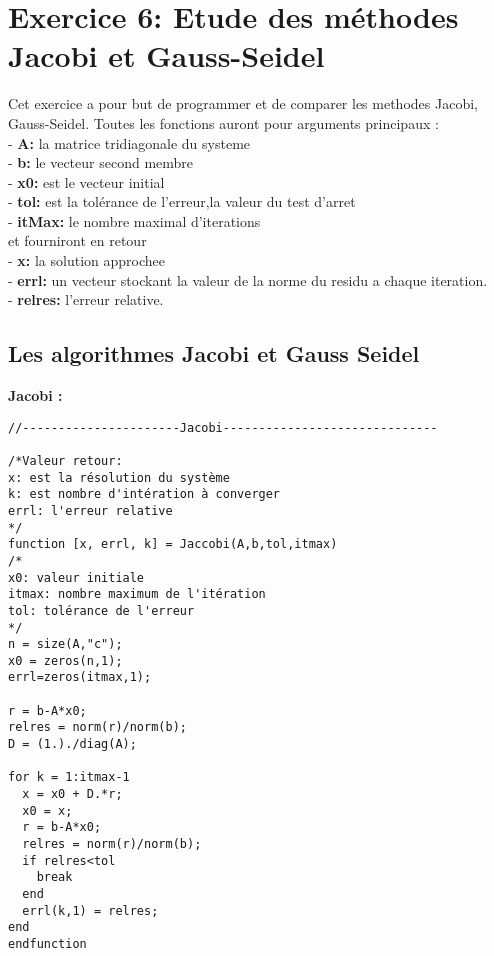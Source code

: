 \documentclass[12pt]{report}
\begin{document}
\section{Exercice 6: Etude des méthodes Jacobi et Gauss-Seidel}

Cet exercice a pour but de programmer et de comparer les methodes Jacobi, Gauss-Seidel. Toutes les fonctions 
auront pour arguments principaux :\\ [0.3cm]
- \textbf{A:} la matrice tridiagonale du systeme\\
- \textbf{b:} le vecteur second membre\\
- \textbf{x0:} est le vecteur initial\\
- \textbf{tol:} est la tolérance de l'erreur,la valeur du test d’arret \\
- \textbf{itMax:} le nombre maximal d’iterations\\[0.3cm]
et fourniront en retour\\[0.2cm]
- \textbf{x:} la solution approchee\\
- \textbf{errl:} un vecteur stockant la valeur de la norme du residu  a chaque iteration.\\
- \textbf{relres:} l’erreur relative.\\

\subsection{Les algorithmes Jacobi et Gauss Seidel}

\textbf{Jacobi :}

\begin{lstlisting}
//----------------------Jacobi------------------------------

/*Valeur retour:
x: est la résolution du système
k: est nombre d'intération à converger
errl: l'erreur relative
*/
function [x, errl, k] = Jaccobi(A,b,tol,itmax)
/*
x0: valeur initiale
itmax: nombre maximum de l'itération
tol: tolérance de l'erreur
*/    
n = size(A,"c");
x0 = zeros(n,1);
errl=zeros(itmax,1);

r = b-A*x0;
relres = norm(r)/norm(b);
D = (1.)./diag(A);

for k = 1:itmax-1    
  x = x0 + D.*r;
  x0 = x;
  r = b-A*x0;
  relres = norm(r)/norm(b);
  if relres<tol
    break
  end
  errl(k,1) = relres;
end    
endfunction
\end{lstlisting}
\end{document}

